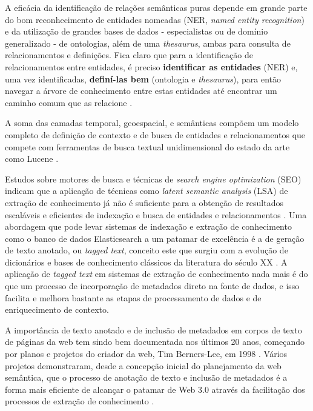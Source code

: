 A eficácia da identificação de relações semânticas puras depende em grande parte do bom reconhecimento de entidades nomeadas (NER, \textit{named entity recognition}) e da utilização de grandes bases de dados - especialistas ou de domínio generalizado - de ontologias, além de uma \textit{thesaurus}, ambas para consulta de relacionamentos e definições. Fica claro que para a identificação de relacionamentos entre entidades, é preciso \textbf{identificar as entidades} (NER) e, uma vez identificadas, \textbf{definí-las bem} (ontologia e \textit{thesaurus}), para então navegar a árvore de conhecimento entre estas entidades até encontrar um caminho comum que as relacione \cite{Amann2000IntegratingOA}.

A soma das camadas temporal, geoespacial, e semânticas compõem um modelo completo de definição de contexto e de busca de entidades e relacionamentos que compete com ferramentas de busca textual unidimensional do estado da arte como Lucene \cite{Li2014TowardsGS}.

Estudos sobre motores de busca e técnicas de \textit{search engine optimization} (SEO) indicam que a aplicação de técnicas como \textit{latent semantic analysis} (LSA) de extração de conhecimento já não é suficiente para a obtenção de resultados escaláveis e eficientes de indexação e busca de entidades e relacionamentos \cite{lsi:seo}. Uma abordagem que pode levar sistemas de indexação e extração de conhecimento como o banco de dados Elasticsearch a um patamar de excelência \cite{elastic:annotated} é a de geração de texto anotado, ou \textit{tagged text}, conceito este que surgiu com a evolução de dicionários e bases de conhecimento clássicos da literatura do século XX \cite{Tompa1989WhatI}. A aplicação de \textit{tagged text} em sistemas de extração de conhecimento nada mais é do que um processo de incorporação de metadados direto na fonte de dados, e isso facilita e melhora bastante as etapas de processamento de dados e de enriquecimento de contexto.

A importância de texto anotado e de inclusão de metadados em corpos de texto de páginas da web tem sindo bem documentada nos últimos 20 anos, começando por planos e projetos do criador da web, Tim Berners-Lee, em 1998 \cite{semantic:roadmap}. Vários projetos demonstraram, desde a concepção inicial do planejamento da web semântica, que o processo de anotação de texto e inclusão de metadados é a forma mais eficiente de alcançar o patamar de Web 3.0 através da facilitação dos processos de extração de conhecimento \cite{Handschuh2005CreatingOM,Slimani2013SemanticAT}.

